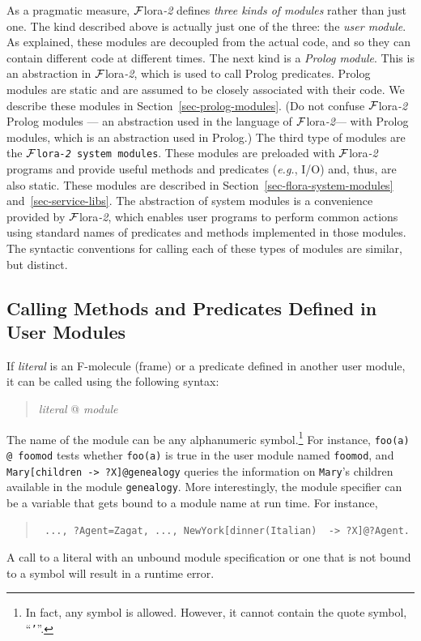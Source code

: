 \documentclass[11pt]{article}
\newcommand{\mvd}{{\mbox{\tt \,->\,}}}  %
\newcommand{\FLORA}{{\mbox{\sc ${\cal F}${lora}\rm\emph{-2}}}\xspace}
\begin{document}
As a pragmatic measure, \FLORA defines \emph{three kinds of modules} rather
than just one. The kind described above is actually just one of the three:
the \emph{user module}. As explained, these modules are decoupled from the
actual code, and so they can contain different code at different times.
The next kind is a \emph{Prolog module}. This is an abstraction in \FLORA,
which is used to call Prolog predicates. Prolog modules are static and are
assumed to be closely associated with their code. We describe these modules
in Section~\ref{sec-prolog-modules}. (Do not confuse \FLORA Prolog modules
--- an abstraction used in the language of \FLORA --- with Prolog modules,
which is an abstraction used in Prolog.)  The third type of modules are the
{\tt \FLORA system modules}. These modules are preloaded with \FLORA
programs and provide useful methods and predicates ({\it e.g.}, I/O) and,
thus, are also static. These modules are described in
Section~\ref{sec-flora-system-modules} and~\ref{sec-service-libs}. The
abstraction of system modules is a convenience provided by \FLORA, which
enables user programs to perform common actions using standard names of
predicates and methods implemented in those modules. The syntactic
conventions for calling each of these types of modules are similar, but
distinct.


\subsection{Calling Methods and Predicates Defined in User Modules}


%
If \emph{literal} is an F-molecule (frame) or a predicate defined in another
user module, it can be called using the following syntax:
\begin{quote}
\emph{literal} @ \emph{module} 
\end{quote}
The name of the module can be any alphanumeric symbol.\footnote{
  In fact, any symbol is allowed. However, it cannot contain the quote
  symbol, ``{\tt '}''.
  }
For instance, \verb|foo(a) @ foomod| tests whether {\tt foo(a)} is true in
the user module named {\tt foomod}, and {\tt Mary[children\mvd ?X]@genealogy}
queries the information on {\tt Mary}'s children available in the module
{\tt genealogy}. More interestingly, the module specifier can be a variable
that gets bound to a module name at run time. For instance, 
\begin{quote}
 {\tt
   ..., ?Agent=Zagat, ..., NewYork[dinner(Italian) \mvd ?X]@?Agent.
   }
\end{quote}
A call to a literal with an unbound module specification or one that is not
bound to a symbol will result in a runtime error.
\end{document}
